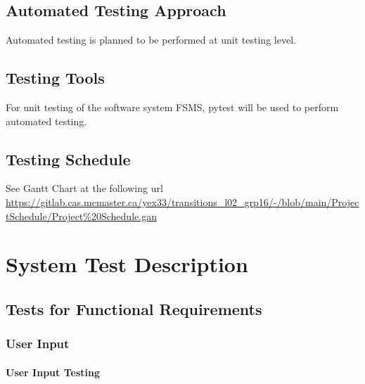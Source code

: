 \documentclass[12pt, titlepage]{article}
\begin{document}
\subsection{Automated Testing Approach}
Automated testing is planned to be performed at unit testing level.
\subsection{Testing Tools}
For unit testing of the software system FSMS, pytest will be used to perform
automated testing.
\subsection{Testing Schedule}
		
See Gantt Chart at the following url \url{https://gitlab.cas.mcmaster.ca/yex33/transitions_l02_grp16/-/blob/main/ProjectSchedule/Project%20Schedule.gan}

\section{System Test Description}
	
\subsection{Tests for Functional Requirements}

\subsubsection{User Input}
		
\paragraph{User Input Testing}
\end{document}
